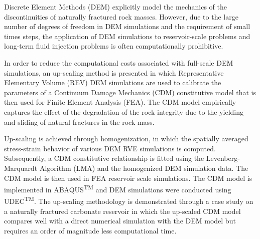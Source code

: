 Discrete Element Methods (DEM) explicitly model the mechanics of the discontinuities of naturally fractured rock masses. However, due to the large number of degrees of freedom in DEM simulations and the requirement of small times steps, the application of DEM simulations to reservoir-scale problems and long-term fluid injection problems is often computationally prohibitive.

In order to reduce the computational costs associated with full-scale DEM simulations, an up-scaling method is presented in which Representative Elementary Volume (REV) DEM simulations are used to calibrate the parameters of a Continuum Damage Mechanics (CDM) constitutive model that is then used for Finite Element Analysis (FEA). The CDM model empirically captures the effect of the degradation of the rock integrity due to the yielding and sliding of natural fractures in the rock mass.

Up-scaling is achieved through homogenization, in which the spatially averaged stress-strain behavior of various DEM RVE simulations is computed. Subsequently, a CDM constitutive relationship is fitted using the Levenberg-Marquardt Algorithm (LMA) and the homogenized DEM simulation data. The CDM model is then used in FEA reservoir scale simulations. The CDM model is implemented in ABAQUS\textsuperscript{TM} and DEM simulations were conducted using UDEC\textsuperscript{TM}. The up-scaling methodology is demonstrated through a case study on a naturally fractured carbonate reservoir in which the up-scaled CDM model compares well with a direct numerical simulation with the DEM model but requires an order of magnitude less computational time.